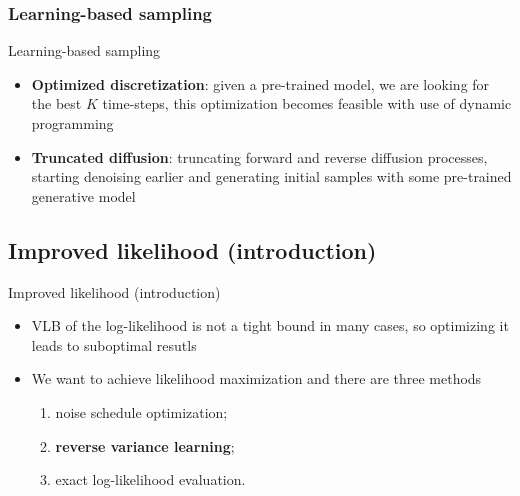 \documentclass{beamer}
\begin{document}
\subsubsection{Learning-based sampling}
\begin{frame}{Learning-based sampling}
\begin{itemize}
  \item \textbf{Optimized discretization}: given a pre-trained model, we are looking for the best $K$ time-steps, this optimization becomes feasible with use of dynamic programming 
  \item \textbf{Truncated diffusion}: truncating forward and reverse diffusion processes, starting denoising earlier and generating initial samples with some pre-trained generative model 
\end{itemize}
\end{frame}

\subsection{Improved likelihood (introduction)}
\begin{frame}{Improved likelihood (introduction)}
\begin{itemize}
  \item VLB of the log-likelihood is not a tight bound in many cases, so optimizing it leads to suboptimal resutls
  \item We want to achieve likelihood maximization and there are three methods 
  \begin{enumerate}
    \item noise schedule optimization;
    \item \textbf{reverse variance learning}; 
    \item exact log-likelihood evaluation.
  \end{enumerate}
\end{itemize}
\end{frame}
\end{document}
